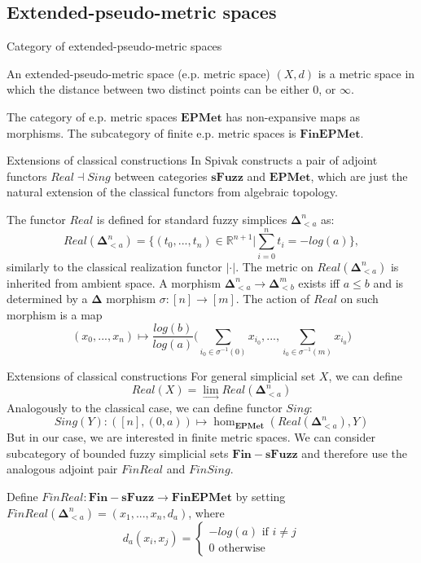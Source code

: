 \documentclass{beamer}
\theoremstyle{named}
\begin{document}
\subsection{Extended-pseudo-metric spaces}

\begin{frame}{Category of extended-pseudo-metric spaces}
	\begin{definition}
		An extended-pseudo-metric space (e.p. metric space) $(X,d)$ is a metric space in which the distance between two distinct points can be either $0$, or $\infty$.
		
		The category of e.p. metric spaces $\pmb{EPMet}$ has non-expansive maps as morphisms. The subcategory of finite e.p. metric spaces is $\pmb{FinEPMet}$.
	\end{definition}
\end{frame}

\begin{frame}{Extensions of classical constructions}
	In \cite{spivak} Spivak constructs a pair of adjoint functors $Real \dashv Sing$ between categories $\pmb{sFuzz}$ and $\pmb{EPMet}$, which are just the natural extension of the classical functors from algebraic topology. 
	
	The functor $Real$ is defined for standard fuzzy simplices $\mathbf{\Delta}^n_{<a}$ as:
	\[
		Real(\mathbf{\Delta}^n_{<a}) = \{ (t_0, ..., t_n) \in \mathbb{R}^{n+1} | \sum\limits_{i=0}^{n} t_i = -log(a) \},
	\]
	similarly to the classical realization functor $| \cdot |$. The metric on $Real(\mathbf{\Delta}^n_{<a})$ is inherited from ambient space. A morphism $\mathbf{\Delta}^n_{<a} \to \mathbf{\Delta}^m_{<b}$ exists iff $a \leq b$ and is determined by a $\pmb{\Delta}$ morphism $\sigma: [n] \to [m]$. The action of $Real$ on such morphism is a map
	\[
		(x_0, ..., x_n) \mapsto \frac{log(b)}{log(a)}\big( \sum\limits_{i_0 \in \sigma^{-1}(0)}x_{i_0}, ..., \sum\limits_{i_0 \in \sigma^{-1}(m)}x_{i_0} \big)
	\]
\end{frame}

\begin{frame}{Extensions of classical constructions}
	For general simplicial set $X$, we can define
\[
Real(X) = \lim\limits_{\to} Real(\mathbf{\Delta}^n_{<a})
\]
Analogously to the classical case, we can define functor $Sing$:
\[
Sing(Y): ([n], (0,a)) \mapsto \hom_{\pmb{EPMet}} (Real(\mathbf{\Delta}^n_{<a}), Y)
\]
But in our case, we are interested in finite metric spaces. We can consider subcategory of bounded fuzzy simplicial sets $\pmb{Fin-sFuzz}$ and therefore use the analogous adjoint pair $FinReal$ and $FinSing$.
	\begin{definition}
		Define $FinReal : \pmb{Fin-sFuzz} \to \pmb{FinEPMet} $ by setting $FinReal(\mathbf{\Delta}^n_{<a}) = ({x_1, ..., x_n}, d_a)$, where
		\[
		d_a(x_i, x_j) = \begin{cases}
		-log(a) \text{ if } i \neq j \\
		0 \text{ otherwise}
		\end{cases}
		\]
\end{definition}
\end{frame}
\end{document}

